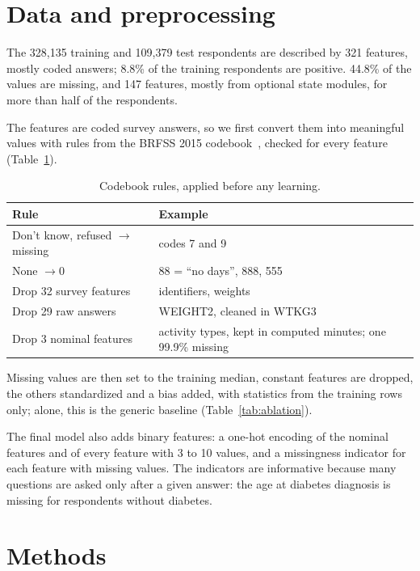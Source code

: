 \documentclass[10pt,conference,compsocconf]{IEEEtran}
\begin{document}
\section{Data and preprocessing}\label{sec:data}
The 328,135 training and 109,379 test respondents are described by 321
features, mostly coded answers; 8.8\% of the training respondents are
positive. 44.8\% of the values are missing, and 147 features, mostly from
optional state modules, for more than half of the respondents.

The features are coded survey answers, so we first convert them into
meaningful values with rules from the BRFSS 2015 codebook~\cite{brfss15},
checked for every feature (Table~\ref{tab:codebook}).

\begin{table}[b]
\centering\footnotesize
\begin{tabular}{@{}p{}p{}@{}}
\toprule
Rule & Example \\
\midrule
Don't know, refused $\to$ missing & codes 7 and 9 \\
None $\to 0$ & 88 = ``no days'', 888, 555 \\
Drop 32 survey features & identifiers, weights \\
Drop 29 raw answers & WEIGHT2, cleaned in WTKG3 \\
Drop 3 nominal features & activity types, kept in computed minutes; one 99.9\% missing \\
\bottomrule
\end{tabular}
\caption{Codebook rules, applied before any learning.}
\label{tab:codebook}
\end{table}
Missing values are then set to the training median, constant features are
dropped, the others standardized and a bias added, with statistics from the
training rows only; alone, this is the generic baseline
(Table~\ref{tab:ablation}).

The final model also adds binary features: a one-hot encoding of the
nominal features and of every feature with 3 to 10 values, and a
missingness indicator for each feature with missing values. The indicators
are informative because many questions are asked only after a given answer:
the age at diabetes diagnosis is missing for respondents without diabetes.

\section{Methods}\label{sec:methods}
\end{document}

